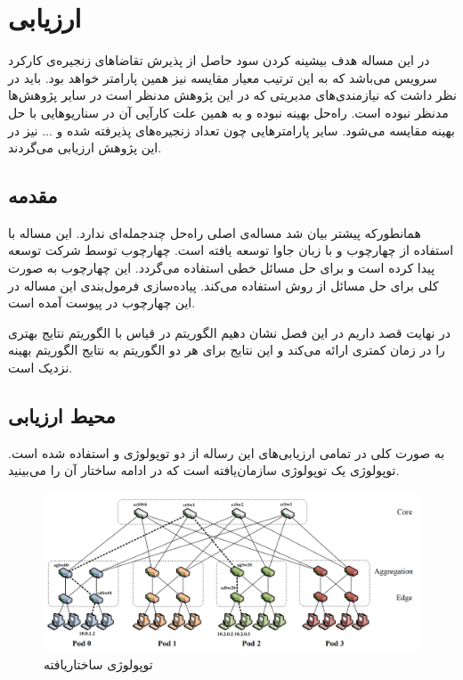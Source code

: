 
\chapter{ارزیابی}

در این مساله هدف بیشینه کردن سود حاصل از پذیرش تقاضاهای زنجیره‌ی کارکرد سرویس می‌باشد که به این ترتیب معیار مقایسه نیز همین پارامتر خواهد بود. باید در نظر داشت که نیازمندی‌های مدیریتی که در این پژوهش مدنظر است در سایر پژوهش‌ها مدنظر نبوده است.
راه‌حل  بهینه نبوده و به همین علت کارآیی آن در سناریوهایی با حل بهینه مقایسه می‌شود.
سایر پارامترهایی چون تعداد زنجیره‌های پذیرفته شده و ... نیز در این پژوهش ارزیابی می‌گردند.

\section{مقدمه}

همانطورکه پیشتر بیان شد مساله‌ی اصلی راه‌حل چندجمله‌ای ندارد. این مساله با استفاده از چهارچوب  و با زبان جاوا
توسعه یافته است. چهارچوب  توسط شرکت  توسعه پیدا کرده است و برای حل مسائل خطی استفاده می‌گردد. این
چهارچوب به صورت کلی برای حل مسائل  از روش  استفاده می‌کند. پیاده‌سازی فرمول‌بندی این مساله در این چهارچوب
در پیوست آمده است.

در نهایت قصد داریم در این فصل نشان دهیم الگوریتم  در قیاس با الگوریتم  نتایج بهتری را در زمان کمتری ارائه می‌کند
و این نتایج برای هر دو الگوریتم به نتایج الگوریتم بهینه نزدیک است.

\section{محیط ارزیابی}
به صورت کلی در تمامی ارزیابی‌های این رساله از دو توپولوژی  و  استفاده شده است.
توپولوژی  یک توپولوژی سازمان‌یافته است که در ادامه ساختار آن را می‌بینید.


\begin{figure}[!h]
\center\includegraphics[scale=.25]{images/fattree}
\caption{توپولوژی ساختاریافته }
\label{fig.2}
\end{figure}

